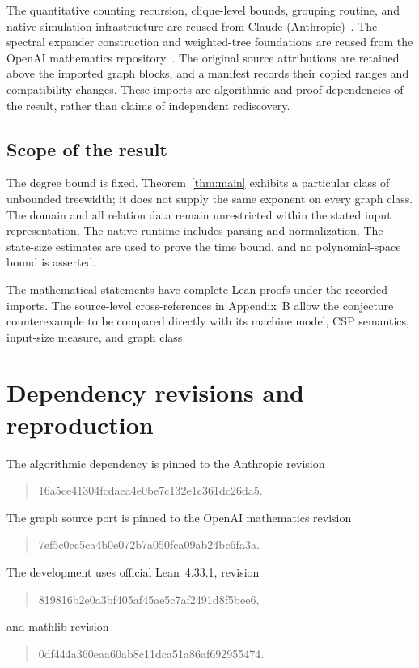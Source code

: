 \documentclass[11pt,reqno]{amsart}
\numberwithin{equation}{section}
\theoremstyle{definition}
\theoremstyle{remark}
\begin{document}
The quantitative counting recursion, clique-level bounds, grouping routine, and native simulation infrastructure are reused from Claude (Anthropic)~\cite{ClaudeETH,AnthropicLean}. The spectral expander construction and weighted-tree foundations are reused from the OpenAI mathematics repository~\cite{OpenAIGraph}. The original source attributions are retained above the imported graph blocks, and a manifest records their copied ranges and compatibility changes. These imports are algorithmic and proof dependencies of the result, rather than claims of independent rediscovery.

\subsection{Scope of the result}

The degree bound is fixed. Theorem~\ref{thm:main} exhibits a particular class of unbounded treewidth; it does not supply the same exponent on every graph class. The domain and all relation data remain unrestricted within the stated input representation. The native runtime includes parsing and normalization. The state-size estimates are used to prove the time bound, and no polynomial-space bound is asserted.

The mathematical statements have complete Lean proofs under the recorded imports. The source-level cross-references in Appendix~B allow the conjecture counterexample to be compared directly with its machine model, CSP semantics, input-size measure, and graph class.

\appendix
\section{Dependency revisions and reproduction}\label{app:reproduce}

The algorithmic dependency is pinned to the Anthropic revision
\begin{quote}\small\ttfamily
16a5ce41304fcdaea4e0be7c132e1c361dc26da5.
\end{quote}
The graph source port is pinned to the OpenAI mathematics revision
\begin{quote}\small\ttfamily
7ef5c0cc5ca4b0e072b7a050fca09ab24bc6fa3a.
\end{quote}
The development uses official Lean~4.33.1, revision
\begin{quote}\small\ttfamily
819816b2e0a3bf405af45ae5c7af2491d8f5bee6,
\end{quote}
and mathlib revision
\begin{quote}\small\ttfamily
0df444a360eaa60ab8c11dca51a86af692955474.
\end{quote}
\end{document}
